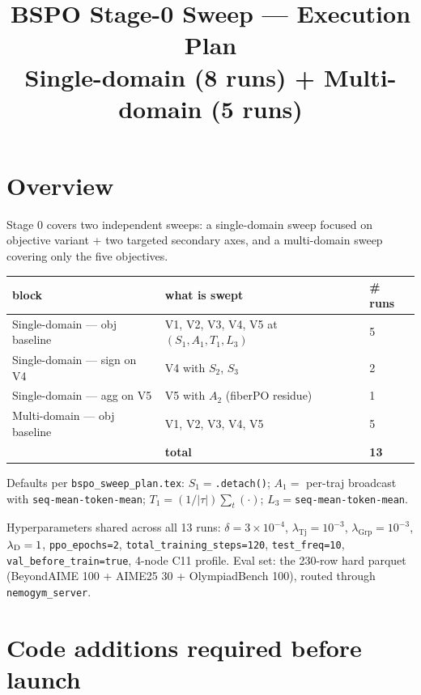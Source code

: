 \documentclass[11pt]{article}
\title{BSPO Stage-0 Sweep --- Execution Plan \\
\large Single-domain (8 runs) + Multi-domain (5 runs)}
\author{}
\date{}
\begin{document}
\maketitle

\section{Overview}

Stage 0 covers two independent sweeps: a single-domain sweep focused on
objective variant + two targeted secondary axes, and a multi-domain sweep
covering only the five objectives.

\begin{center}
\renewcommand{\arraystretch}{1.35}
\begin{tabular}{l l l}
\toprule
block & what is swept & \# runs \\
\midrule
Single-domain --- obj baseline  & V1, V2, V3, V4, V5 at $(S_1, A_1, T_1, L_3)$ & 5 \\
Single-domain --- sign on V4    & V4 with $S_2$, $S_3$                         & 2 \\
Single-domain --- agg on V5     & V5 with $A_2$ (fiberPO residue)              & 1 \\
\midrule
Multi-domain --- obj baseline   & V1, V2, V3, V4, V5                           & 5 \\
\bottomrule
& \textbf{total}                                                               & \textbf{13} \\
\end{tabular}
\end{center}

Defaults per \texttt{bspo\_sweep\_plan.tex}: $S_1 = $\verb|.detach()|;
$A_1 = $ per-traj broadcast with \verb|seq-mean-token-mean|;
$T_1 = (1/|\tau|)\sum_t(\cdot)$; $L_3 = $\verb|seq-mean-token-mean|.

Hyperparameters shared across all 13 runs: $\delta = 3\!\times\!10^{-4}$,
$\lambda_{\text{Tj}} = 10^{-3}$, $\lambda_{\text{Grp}} = 10^{-3}$,
$\lambda_{\text D} = 1$, \verb|ppo_epochs=2|, \verb|total_training_steps=120|,
\verb|test_freq=10|, \verb|val_before_train=true|, 4-node C11 profile.
Eval set: the 230-row hard parquet (BeyondAIME 100 + AIME25 30 +
OlympiadBench 100), routed through \verb|nemogym_server|.

\section{Code additions required before launch}
\end{document}
